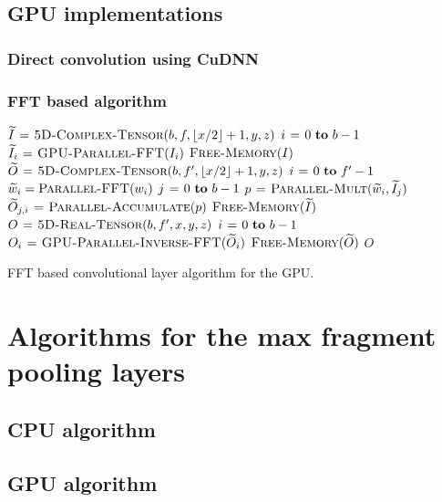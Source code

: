 \documentclass[conference]{IEEEtran}
\DeclarePairedDelimiter{\floor}{\lfloor}{\rfloor}
\begin{document}
\subsection{GPU implementations}

\subsubsection{Direct convolution using CuDNN}

\subsubsection{FFT based algorithm}


\begin{algorithm}
  {\small
  \begin{codebox}
    \li $\widetilde{I} \gets \proc{5D-Complex-Tensor}(b,f,\floor{x/2}+1,y,z)$
    \li \For $i \gets 0 \To b-1$
    \li   \Do $\widetilde{I}_{i} \mathrel{\hspace{1pt}=\hspace{1pt}} \textnormal{\scshape GPU-Parallel-FFT}(I_{i})$
    \End
    \li $\textnormal{\scshape Free-Memory}(I)$
    \li $\widetilde{O} \gets \proc{5D-Complex-Tensor}(b,f',\floor{x/2}+1,y,z)$
    \li \For $i \gets 0 \To f'-1$
    \li    \Do $\widetilde{w}_{i} = \textnormal{\scshape Parallel-FFT}(w_{i})$
    \li        \For $j \gets 0 \To b-1$
    \li           \Do $p \mathrel{\hspace{1pt}=\hspace{1pt}} \textnormal{\scshape Parallel-Mult}(\widetilde{w}_{i}, \widetilde{I}_{j})$
    \li               $\widetilde{O}_{j,i} \mathrel{\hspace{1pt}=\hspace{1pt}} \textnormal{\scshape Parallel-Accumulate}(p)$
    \End \End
    \li $\textnormal{\scshape Free-Memory}(\widetilde{I})$
    \li $O \mathrel{\hspace{1pt}=\hspace{1pt}} \textnormal{\scshape5D-Real-Tensor}(b,f',x,y,z)$
    \li \For $i \gets 0 \To b-1$
    \li   \Do $O_{i} \mathrel{\hspace{1pt}=\hspace{1pt}} \textnormal{\scshape GPU-Parallel-Inverse-FFT}(\widetilde{O}_{i})$
    \End
    \li $\textnormal{\scshape Free-Memory}(\widetilde{O})$
    \li \Return $O$
  \end{codebox}
  }

  \caption{FFT based convolutional layer algorithm for the GPU.}
  \label{alg:gpu_alg}
\end{algorithm}

\section{Algorithms for the max fragment pooling layers}

\subsection{CPU algorithm}
\subsection{GPU algorithm}
\end{document}

